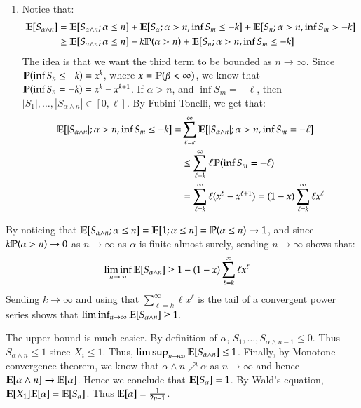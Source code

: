 \documentclass[12pt]{article}
\theoremstyle{definitionstyle}
\newcommand{\1}{\mathds 1}
\renewcommand{\P}{\mathbb P \qty}
\newcommand{\E}{\mathbb E \qty}
\begin{document}
\begin{enumerate}
\begin{enumerate}[label=(\alph*)]
            \item Notice that:
            \begin{align*}
                \E[S_{\alpha \land n}] &= \E[S_{\alpha \land n} ; \alpha \leq n] + \E[S_\alpha ; \alpha > n, \inf S_m \leq -k] + \E[S_n ; \alpha > n, \inf S_m > -k] \\
                &\geq \E[S_{\alpha \land n} ; \alpha \leq n] -k\P(\alpha > n) + \E[S_n ; \alpha > n, \inf S_m \leq -k]
            \end{align*}
            The idea is that we want the third term to be bounded as $n \to \infty$. Since $\P(\inf S_n \leq -k) = x^k$, where $x = \P(\beta < \infty)$, we know that $\P(\inf S_n = -k) = x^k - x^{k+1}$. If $\alpha > n$, and $\inf S_m = -\ell$, then $|S_1|, \ldots, |S_{\alpha \land n}| \in [0, \ell]$. By Fubini-Tonelli, we get that:
            \begin{align*}
                \E[|S_{\alpha \land n}| ; \alpha > n, \inf S_m \leq -k] = &\sum_{\ell=k}^\infty \E[|S_{\alpha \land n}| ; \alpha > n, \inf S_m = -\ell] 
                \\ &\leq \sum_{\ell=k}^\infty \ell\P(\inf S_m = -\ell) 
                \\& = \sum_{\ell=k}^\infty \ell(x^\ell - x^{\ell+1}) = (1-x)\sum_{\ell=k}^\infty \ell x^\ell
            \end{align*}
            \end{enumerate}
            By noticing that $\E[S_{\alpha \land n} ; \alpha \leq n] = \E[1 ; \alpha \leq n] = \P(\alpha \leq n) \to 1$, and since $k\P(\alpha > n) \to 0$ as $n \to \infty$ as $\alpha$ is finite almost surely, sending $n \to \infty$ shows that:
            \begin{align*}
                \liminf_{n \to \infty} \E[S_{\alpha \land n}] &\geq 1 - (1-x)\sum_{\ell=k}^\infty \ell x^\ell
            \end{align*}
            Sending $k \to \infty$ and using that $\sum_{\ell=k}^\infty \ell x^\ell$ is the tail of a convergent power series shows that $\liminf_{n \to \infty} \E[S_{\alpha \land n}] \geq 1$.

            The upper bound is much easier. By definition of $\alpha$, $S_1, \ldots, S_{\alpha \land n -1} \leq 0$. Thus $S_{\alpha \land n} \leq 1$ since $X_i \leq 1$. Thus, $\limsup_{n \to \infty} \E[S_{\alpha \land n}] \leq 1$. Finally, by Monotone convergence theorem, we know that $\alpha \land n \nearrow \alpha$ as $n \to \infty$ and hence $\E[\alpha \land n] \to \E[\alpha]$. Hence we conclude that $\E[S_\alpha] = 1$. By Wald's equation, $\E[X_1] \E[\alpha] = \E[S_\alpha]$. Thus $\E[\alpha] = \frac{1}{2p-1}$.
    \end{enumerate}
\end{document}
